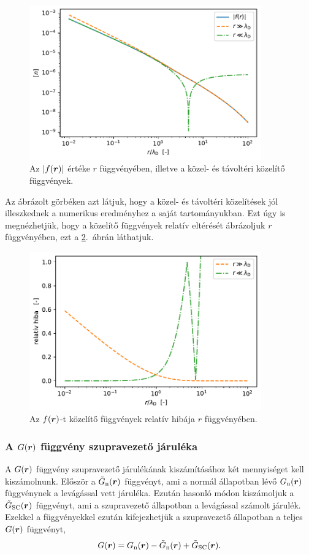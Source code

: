 \documentclass[a4paper,12pt,titlepage]{article}
\newcommand{\RR}{{\vb*{r}}}
\begin{document}
\begin{figure}[h!]
	\centering
	\includegraphics[width=10cm]{F_sc.pdf}
	\caption{Az $\left| f(\RR) \right|$ értéke $r$ függvényében, illetve a közel- és távoltéri közelítő függvények.}
	\label{F-sc-fig}
\end{figure}

Az ábrázolt görbéken azt látjuk, hogy a közel- és távoltéri közelítések jól illeszkednek a numerikus eredményhez a saját tartományukban.  Ezt úgy is megnézhetjük, hogy a közelítő függvények relatív eltérését ábrázoljuk $r$ függvényében, ezt a \ref{F-sc-error-fig}.\ ábrán láthatjuk.

\begin{figure}[h!]
	\centering
	\includegraphics[width=10cm]{F_sc_error.pdf}
	\caption{Az $f(\RR)$-t közelítő függvények relatív hibája $r$ függvényében.}
	\label{F-sc-error-fig}
\end{figure}


\subsubsection{A $G(\RR)$ függvény szupravezető járuléka}

A $G(\RR)$ függvény szupravezető járulékának kiszámításához két mennyiséget kell kiszámolnunk.  Először a $\tilde{G}_\text{n}(\RR)$ függvényt, ami a normál állapotban lévő $G_\text{n}(\RR)$ függvénynek a levágással vett járuléka.  Ezután hasonló módon kiszámoljuk a $\tilde{G}_\text{SC}(\RR)$ függvényt, ami a szupravezető állapotban a levágással számolt járulék.  Ezekkel a függvényekkel ezután kifejezhetjük a szupravezető állapotban a teljes $G(\RR)$ függvényt,
\begin{equation}
	G(\RR) = G_\text{n}(\RR) - \tilde{G}_\text{n}(\RR) + \tilde{G}_\text{SC}(\RR).
\end{equation}
\end{document}
